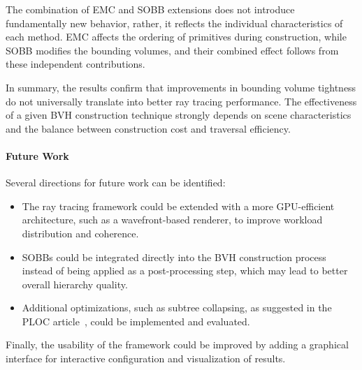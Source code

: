 The combination of EMC and SOBB extensions does not introduce fundamentally new behavior, rather, it reflects the individual characteristics of each method. EMC affects the ordering of primitives during construction, while SOBB modifies the bounding volumes, and their combined effect follows from these independent contributions.

In summary, the results confirm that improvements in bounding volume tightness do not universally translate into better ray tracing performance. The effectiveness of a given BVH construction technique strongly depends on scene characteristics and the balance between construction cost and traversal efficiency.

\paragraph{Future Work}

Several directions for future work can be identified:
\begin{itemize}
    \item The ray tracing framework could be extended with a more GPU-efficient architecture, such as a wavefront-based renderer, to improve workload distribution and coherence.
    \item SOBBs could be integrated directly into the BVH construction process instead of being applied as a post-processing step, which may lead to better overall hierarchy quality.
    \item Additional optimizations, such as subtree collapsing, as suggested in the PLOC article~\cite{MB17}, could be implemented and evaluated.
\end{itemize}
 Finally, the usability of the framework could be improved by adding a graphical interface for interactive configuration and visualization of results.